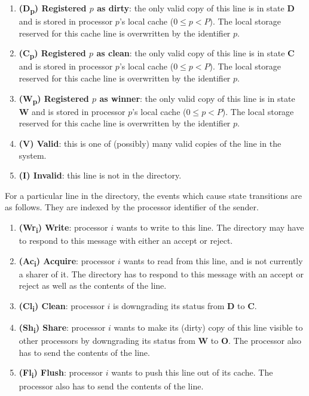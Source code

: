 \documentclass{article}
\begin{document}
\begin{enumerate}
\item \textbf{(D\textsubscript{p}) Registered $p$ as dirty}: the only valid copy of this line is in state \textbf{D} and is stored in processor $p$'s local cache ($0 \leq p < P$). The local storage reserved for this cache line is overwritten by the identifier $p$.
\item \textbf{(C\textsubscript{p}) Registered $p$ as clean}: the only valid copy of this line is in state \textbf{C} and is stored in processor $p$'s local cache ($0 \leq p < P$). The local storage reserved for this cache line is overwritten by the identifier $p$.
\item \textbf{(W\textsubscript{p}) Registered $p$ as winner}: the only valid copy of this line is in state \textbf{W} and is stored in processor $p$'s local cache ($0 \leq p < P$). The local storage reserved for this cache line is overwritten by the identifier $p$.
\item \textbf{(V) Valid}: this is one of (possibly) many valid copies of the line in the system.
\item \textbf{(I) Invalid}: this line is not in the directory.
\end{enumerate}

For a particular line in the directory, the events which cause state transitions are as follows. They are indexed by the processor identifier of the sender.

\begin{enumerate}
\item \textbf{(Wr\textsubscript{i}) Write}: processor $i$ wants to write to this line. The directory may have to respond to this message with either an accept or reject.
\item \textbf{(Ac\textsubscript{i}) Acquire}: processor $i$ wants to read from this line, and is not currently a sharer of it. The directory has to respond to this message with an accept or reject as well as the contents of the line.
\item \textbf{(Cl\textsubscript{i}) Clean}: processor $i$ is downgrading its status from \textbf{D} to \textbf{C}.
\item \textbf{(Sh\textsubscript{i}) Share}: processor $i$ wants to make its (dirty) copy of this line visible to other processors by downgrading its status from \textbf{W} to \textbf{O}. The processor also has to send the contents of the line.
\item \textbf{(Fl\textsubscript{i}) Flush}: processor $i$ wants to push this line out of its cache. The processor also has to send the contents of the line.
\end{enumerate}
\end{document}
